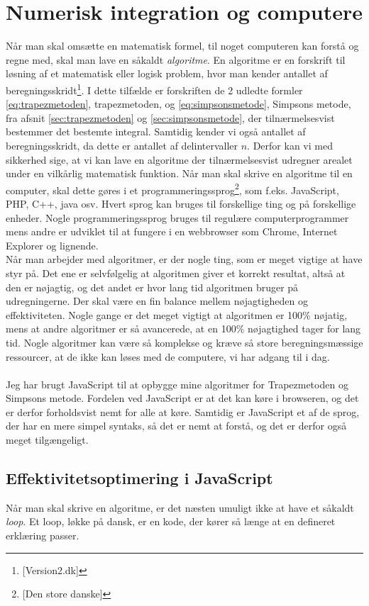 \documentclass[12pt]{article}
\numberwithin{equation}{section}
\begin{document}
\pagebreak
\section{Numerisk integration og computere}
Når man skal omsætte en matematisk formel, til noget computeren kan forstå og regne med, skal man lave en såkaldt \emph{algoritme}. En algoritme er en forskrift til løsning af et matematisk eller logisk problem, hvor man kender antallet af beregningsskridt\footnote{\cite{version2:algoritme}[Version2.dk]}. I dette tilfælde er forskriften de 2 udledte formler \eqref{eq:trapezmetoden}, trapezmetoden, og \eqref{eq:simpsonsmetode}, Simpsons metode, fra afsnit \ref{sec:trapezmetoden} og \ref{sec:simpsonsmetode}, der tilnærmelsesvist bestemmer det bestemte integral. Samtidig kender vi også antallet af beregningsskridt, da dette er antallet af delintervaller $n$. Derfor kan vi med sikkerhed sige, at vi kan lave en algoritme der tilnærmelsesvist udregner arealet under en vilkårlig matematisk funktion.
Når man skal skrive en algoritme til en computer, skal dette gøres i et programmeringssprog\footnote{\cite{denstoredanske:algoritme}[Den store danske]}, som f.eks. JavaScript, PHP, C++, java osv. Hvert sprog kan bruges til forskellige ting og på forskellige enheder. Nogle programmeringssprog bruges til regulære computerprogrammer mens andre er udviklet til at fungere i en webbrowser som Chrome, Internet Explorer og lignende.
\\
Når man arbejder med algoritmer, er der nogle ting, som er meget vigtige at have styr på. Det ene er selvfølgelig at algoritmen giver et korrekt resultat, altså at den er nøjagtig, og det andet er hvor lang tid algoritmen bruger på udregningerne. Der skal være en fin balance mellem nøjagtigheden og effektiviteten. Nogle gange er det meget vigtigt at algoritmen er 100\% nøjatig, mens at andre algoritmer er så avancerede, at en 100\% nøjagtighed tager for lang tid. Nogle algoritmer kan være så komplekse og kræve så store beregningsmæssige ressourcer, at de ikke kan løses med de computere, vi har adgang til i dag.
\\\\
Jeg har brugt JavaScript til at opbygge mine algoritmer for Trapezmetoden og Simpsons metode. Fordelen ved JavaScript er at det kan køre i browseren, og det er derfor forholdsvist nemt for alle at køre. Samtidig er JavaScript et af de sprog, der har en mere simpel syntaks, så det er nemt at forstå, og det er derfor også meget tilgængeligt.

\subsection{Effektivitetsoptimering i JavaScript}
Når man skal skrive en algoritme, er det næsten umuligt ikke at have et såkaldt \emph{loop}. Et loop, løkke på dansk, er en kode, der kører så længe at en defineret erklæring passer. 
\end{document}
